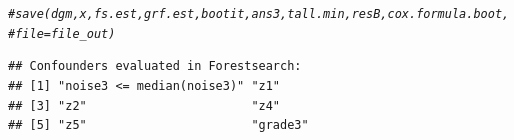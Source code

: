 \documentclass[smallextended]{svjour3}
\makeatletter
\newcommand{\hlcom}[1]{\textcolor[rgb]{0.678,0.584,0.686}{\textit{#1}}}%
\newenvironment{kframe}{%
 \def\at@end@of@kframe{}%
 \ifinner\ifhmode%
  \def\at@end@of@kframe{\end{minipage}}%
  \begin{minipage}{\columnwidth}%
 \fi\fi%
 \def\FrameCommand##1{\hskip\@totalleftmargin \hskip-\fboxsep
 \colorbox{shadecolor}{##1}\hskip-\fboxsep
     \hskip-\linewidth \hskip-\@totalleftmargin \hskip\columnwidth}%
 \MakeFramed {\advance\hsize-\width
   \@totalleftmargin\z@ \linewidth\hsize
   \@setminipage}}%
 {\par\unskip\endMakeFramed%
 \at@end@of@kframe}
\newenvironment{knitrout}{}{} %
\makeatother
\begin{document}
\begin{knitrout}
\begin{kframe}
\begin{alltt}
\hlcom{# save(dgm, x, fs.est, grf.est, bootit, ans3, tall.min, resB, cox.formula.boot,}
\hlcom{# file=file_out)}
\end{alltt}
\end{kframe}
\end{knitrout}



\begin{knitrout}
\color{fgcolor}\begin{kframe}
\begin{verbatim}
## Confounders evaluated in Forestsearch:
## [1] "noise3 <= median(noise3)" "z1"                      
## [3] "z2"                       "z4"                      
## [5] "z5"                       "grade3"
\end{verbatim}
\end{kframe}
\end{knitrout}
\end{document}
